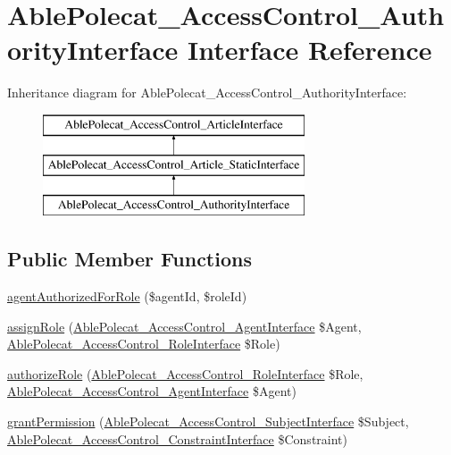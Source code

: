\hypertarget{interface_able_polecat___access_control___authority_interface}{}\section{Able\+Polecat\+\_\+\+Access\+Control\+\_\+\+Authority\+Interface Interface Reference}
\label{interface_able_polecat___access_control___authority_interface}
Inheritance diagram for Able\+Polecat\+\_\+\+Access\+Control\+\_\+\+Authority\+Interface\+:\begin{figure}[H]
\begin{center}
\leavevmode
\includegraphics[height=3.000000cm]{interface_able_polecat___access_control___authority_interface}
\end{center}
\end{figure}
\subsection*{Public Member Functions}
\begin{DoxyCompactItemize}
\item 
\hyperlink{interface_able_polecat___access_control___authority_interface_ae19e2629918d2aadb8ee4a483a2900d0}{agent\+Authorized\+For\+Role} (\$agent\+Id, \$role\+Id)
\item 
\hyperlink{interface_able_polecat___access_control___authority_interface_a249d9e05ed9e93505c5ec720a5f392a7}{assign\+Role} (\hyperlink{interface_able_polecat___access_control___agent_interface}{Able\+Polecat\+\_\+\+Access\+Control\+\_\+\+Agent\+Interface} \$Agent, \hyperlink{interface_able_polecat___access_control___role_interface}{Able\+Polecat\+\_\+\+Access\+Control\+\_\+\+Role\+Interface} \$Role)
\item 
\hyperlink{interface_able_polecat___access_control___authority_interface_a97daec0bf34b2b3e201a15b84152d2d2}{authorize\+Role} (\hyperlink{interface_able_polecat___access_control___role_interface}{Able\+Polecat\+\_\+\+Access\+Control\+\_\+\+Role\+Interface} \$Role, \hyperlink{interface_able_polecat___access_control___agent_interface}{Able\+Polecat\+\_\+\+Access\+Control\+\_\+\+Agent\+Interface} \$Agent)
\item 
\hyperlink{interface_able_polecat___access_control___authority_interface_af10c6f88824fd201988c5ea92c743490}{grant\+Permission} (\hyperlink{interface_able_polecat___access_control___subject_interface}{Able\+Polecat\+\_\+\+Access\+Control\+\_\+\+Subject\+Interface} \$Subject, \hyperlink{interface_able_polecat___access_control___constraint_interface}{Able\+Polecat\+\_\+\+Access\+Control\+\_\+\+Constraint\+Interface} \$Constraint)
\end{DoxyCompactItemize}
